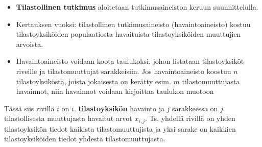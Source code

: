 \documentclass[
]{book}
\begin{document}
\begin{itemize}
\item
  \textbf{Tilastollinen tutkimus} aloitetaan tutkimusaineiston keruun suunnittelulla.
\item
  Kertauksen vuoksi: tilastollinen tutkimusaineisto (havaintoaineisto) kostuu tilastoyksiköiden populaatiosta havaituista tilastoyksiköiden muuttujien arvoista.
\item
  Havaintoaineisto voidaan koota taulukoksi, johon listataan tilastoyksiköt riveille ja tilastomuuttujat sarakkeisiin. Jos havaintoaineisto koostuu \(n\) tilastoyksiköstä, joista jokaisesta on kerätty esim. \(m\) tilastomuuttujasta havainnot, niin havainnot voidaan kirjoittaa taulukon muotoon
\end{itemize}

Tässä siis rivillä \(i\) on \(i\). \textbf{tilastoyksikön} havainto ja \(j\) sarakkeessa on \(j\). tilastollisesta muuttujasta havaitut arvot \(x_{i,j}\). Ts. yhdellä rivillä on yhden tilastoyksikön tiedot kaikista tilastomuuttujista ja yksi sarake on kaikkien tilastoyksiköiden tiedot yhdestä tilastomuuttujasta.
\end{document}
